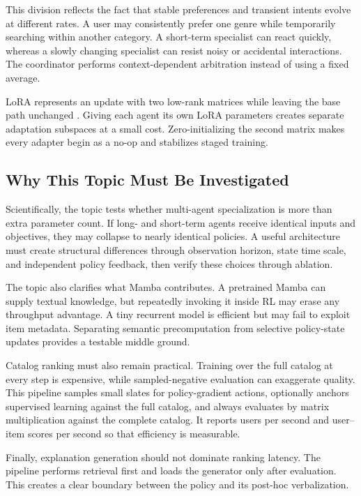 \documentclass[11pt,a4paper]{article}
\begin{document}
This division reflects the fact that stable preferences and transient intents evolve at different rates. A user may consistently prefer one genre while temporarily searching within another category. A short-term specialist can react quickly, whereas a slowly changing specialist can resist noisy or accidental interactions. The coordinator performs context-dependent arbitration instead of using a fixed average.

LoRA represents an update with two low-rank matrices while leaving the base path unchanged \cite{LORA}. Giving each agent its own LoRA parameters creates separate adaptation subspaces at a small cost. Zero-initializing the second matrix makes every adapter begin as a no-op and stabilizes staged training.

\subsection{Why This Topic Must Be Investigated}

Scientifically, the topic tests whether multi-agent specialization is more than extra parameter count. If long- and short-term agents receive identical inputs and objectives, they may collapse to nearly identical policies. A useful architecture must create structural differences through observation horizon, state time scale, and independent policy feedback, then verify these choices through ablation.

The topic also clarifies what Mamba contributes. A pretrained Mamba can supply textual knowledge, but repeatedly invoking it inside RL may erase any throughput advantage. A tiny recurrent model is efficient but may fail to exploit item metadata. Separating semantic precomputation from selective policy-state updates provides a testable middle ground.

Catalog ranking must also remain practical. Training over the full catalog at every step is expensive, while sampled-negative evaluation can exaggerate quality. This pipeline samples small slates for policy-gradient actions, optionally anchors supervised learning against the full catalog, and always evaluates by matrix multiplication against the complete catalog. It reports users per second and user--item scores per second so that efficiency is measurable.

Finally, explanation generation should not dominate ranking latency. The pipeline performs retrieval first and loads the generator only after evaluation. This creates a clear boundary between the policy and its post-hoc verbalization.
\end{document}
